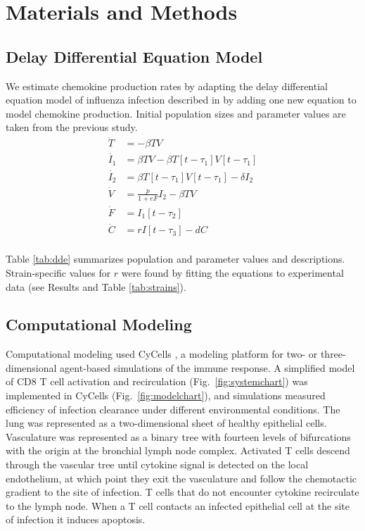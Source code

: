 \documentclass[10pt]{article}
\begin{document}
\section*{Materials and Methods}

\subsection*{Delay Differential Equation Model}

We estimate chemokine production rates by adapting the delay differential equation model of influenza infection described in \cite{Mitchell2011} by adding one new equation to model chemokine production.  Initial population sizes and parameter values are taken from the previous study.
{\footnotesize
\begin{equation}
\begin{aligned}
\dot{T} &= - \beta T V \\
\dot{I_1} &= \beta T V - \beta T[t-\tau_1]V[t-\tau_1] \\
\dot{I_2} &= \beta T[t-\tau_1]V[t-\tau_1] - \delta I_2 \\
\dot{V} &= \frac{p}{1+eF} I_2  - \beta T V  \\
\dot{F} &=  I_1[t-\tau_2] \\
\dot{C} &= r I[t-\tau_3] - d C \\
\end{aligned}
\label{eq:dde}
\end{equation}
\vspace{.05in}
}

Table \ref{tab:dde} summarizes population and parameter values and descriptions.  Strain-specific values for $r$ were found by fitting the equations to experimental data (see Results and Table \ref{tab:strains}).


\subsection*{Computational Modeling}

Computational modeling used CyCells \cite{Warrender2006}, a modeling platform for two- or three-dimensional agent-based simulations of the immune response. A simplified model of CD8 T cell activation and recirculation (Fig.~\ref{fig:systemchart}) was implemented in CyCells (Fig.~\ref{fig:modelchart}), and simulations measured efficiency of infection clearance under different environmental conditions. The lung was represented as a two-dimensional sheet of healthy epithelial cells. Vasculature was represented as a binary tree with fourteen levels of bifurcations with the origin at the bronchial lymph node complex. Activated T cells descend through the vascular tree until cytokine signal is detected on the local endothelium, at which point they exit the vasculature and follow the chemotactic gradient to the site of infection. T cells that do not encounter cytokine recirculate to the lymph node.  When a T cell contacts an infected epithelial cell at the site of infection it induces apoptosis.
\end{document}
